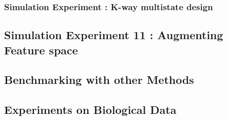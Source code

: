 \subsubsection{Simulation Experiment : K-way multistate design}

\subsection{Simulation Experiment 11 : Augmenting Feature space}

\subsection{Benchmarking with other Methods}

\subsection{Experiments on Biological Data}


